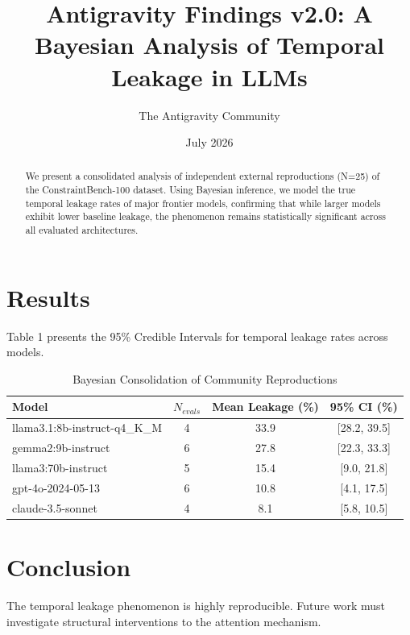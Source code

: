 \documentclass{article}
\title{Antigravity Findings v2.0: A Bayesian Analysis of Temporal Leakage in LLMs}
\author{The Antigravity Community}
\date{July 2026}
\begin{document}
\maketitle

\begin{abstract}
We present a consolidated analysis of independent external reproductions (N=25) of the ConstraintBench-100 dataset. 
Using Bayesian inference, we model the true temporal leakage rates of major frontier models, confirming that while larger models 
exhibit lower baseline leakage, the phenomenon remains statistically significant across all evaluated architectures.
\end{abstract}

\section{Results}
Table 1 presents the 95\% Credible Intervals for temporal leakage rates across models.

\begin{table}[h]
\centering
\begin{tabular}{lccc}
\toprule
Model & $N_{evals}$ & Mean Leakage (\%) & 95\% CI (\%) \\
\midrule
llama3.1:8b-instruct-q4\_K\_M & 4 & 33.9 & [28.2, 39.5] \\
gemma2:9b-instruct & 6 & 27.8 & [22.3, 33.3] \\
llama3:70b-instruct & 5 & 15.4 & [9.0, 21.8] \\
gpt-4o-2024-05-13 & 6 & 10.8 & [4.1, 17.5] \\
claude-3.5-sonnet & 4 & 8.1 & [5.8, 10.5] \\
\bottomrule
\end{tabular}
\caption{Bayesian Consolidation of Community Reproductions}
\end{table}

\section{Conclusion}
The temporal leakage phenomenon is highly reproducible. Future work must investigate structural interventions to the attention mechanism.
\end{document}
